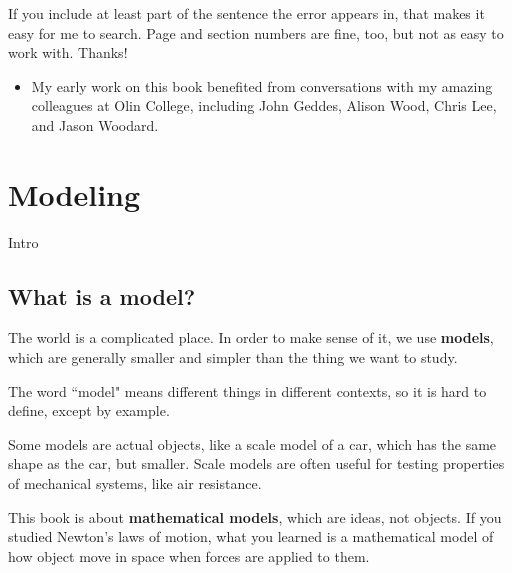 \documentclass[12pt]{book}
\theoremstyle{exercise}
\begin{document}
If you include at least part of the sentence the
error appears in, that makes it easy for me to search.  Page and
section numbers are fine, too, but not as easy to work with.
Thanks!

\small

\begin{itemize}

\item My early work on this book benefited from conversations with
my amazing colleagues at Olin College, including John Geddes, Alison
Wood, Chris Lee, and Jason Woodard.


\end{itemize}



\normalsize

\cleardoublepage

\begin{latexonly}

\tableofcontents

\cleardoublepage

\end{latexonly}

\mainmatter


\chapter{Modeling}
\label{sounds}

Intro

\section{What is a model?}

The world is a complicated place.  In order to make sense of it, we use {\bf models}, which are generally smaller and simpler than the thing we want to study.

The word ``model" means different things in different contexts, so it is hard to define, except by example.

Some models are actual objects, like a scale model of a car, which has the same shape as the car, but smaller.  Scale models are often useful for testing properties of mechanical systems, like air resistance.

This book is about {\bf mathematical models}, which are ideas, not objects.  If you studied Newton's laws of motion, what you learned is a mathematical model of how object move in space when forces are applied to them.
\end{document}
